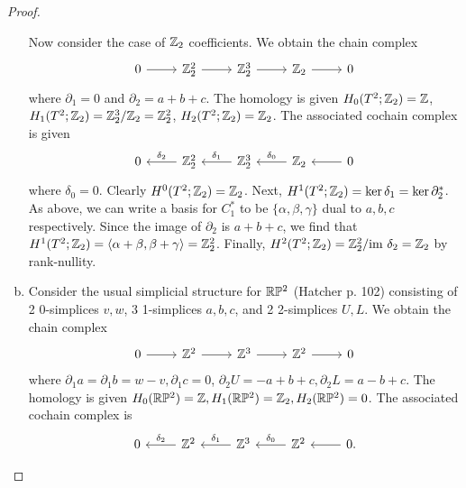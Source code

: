 \documentclass{../../mathnotes}
\begin{document}
\begin{proof}
\begin{enumerate}[(a)]
            Now consider the case of $\mathbb{Z}_2$ coefficients. We obtain the chain complex
            \begin{equation*}
                \begin{tikzcd}
                    0\ar{r} & \Z_2^2\ar{r} & \Z_2^3\ar{r} & \Z_2\ar{r} & 0
                \end{tikzcd}
            \end{equation*}
            where $\partial_1=0$ and $\partial_2=a+b+c$. The homology is given $H_0(T^2;\mathbb{Z}_2)=\mathbb{Z}$,
            $H_1(T^2;\mathbb{Z}_2)=\mathbb{Z}_2^3/\mathbb{Z}_2=\mathbb{Z}_2^2$, $H_2(T^2;\mathbb{Z}_2)=\mathbb{Z}_2$. The associated cochain complex
            is given
            \begin{equation*}
                \begin{tikzcd}
                    0 & \Z_2^2\ar[swap]{l}{\delta_2} & \Z_2^3\ar[swap]{l}{\delta_1} & \Z_2\ar[swap]{l}{\delta_0} & 0\ar{l}
                \end{tikzcd}
            \end{equation*}
            where $\delta_0=0$. Clearly $H^0(T^2;\mathbb{Z}_2)=\mathbb{Z}_2$. Next, $H^1(T^2;\mathbb{Z}_2)=\ker\delta_1=\ker\partial_2^*$.
            As above, we can write a basis for $C_1^*$ to be $\{\alpha,\beta,\gamma\}$ dual to $a,b,c$ respectively.
            Since the image of $\partial_2$ is $a+b+c$, we find that $H^1(T^2;\mathbb{Z}_2)=\langle \alpha+\beta, \beta+\gamma\rangle=\mathbb{Z}_2^2$.
            Finally, $H^2(T^2;\mathbb{Z}_2)=\mathbb{Z}_2^2/\text{im }\delta_2=\mathbb{Z}_2$ by rank-nullity.
        \item Consider the usual simplicial structure for $\mathbb{R}\mathbb{P}^2$ (Hatcher p. 102) consisting
            of 2 0-simplices $v,w$, 3 1-simplices $a,b,c$, and 2 2-simplices $U,L$. We obtain the chain
            complex
            \begin{equation*}
                \begin{tikzcd}
                    0\ar{r} & \Z^2\ar{r} & \Z^3\ar{r} & \Z^2\ar{r} & 0
                \end{tikzcd}
            \end{equation*}
            where $\partial_1a=\partial_1b=w-v, \partial_1c=0$, $\partial_2U=-a+b+c,\partial_2L=a-b+c$.
            The homology is given $H_0(\mathbb{R}\mathbb{P}^2)=\mathbb{Z}, H_1(\mathbb{R}\mathbb{P}^2)=\mathbb{Z}_2, H_2(\mathbb{R}\mathbb{P}^2)=0$. The associated
            cochain complex is
            \begin{equation*}
                \begin{tikzcd}
                    0 & \Z^2\ar[swap]{l}{\delta_2} & \Z^3\ar[swap]{l}{\delta_1} & \Z^2\ar[swap]{l}{\delta_0} & 0\ar{l}.

\end{tikzcd}
\end{equation*}
\end{enumerate}
\end{proof}
\end{document}
